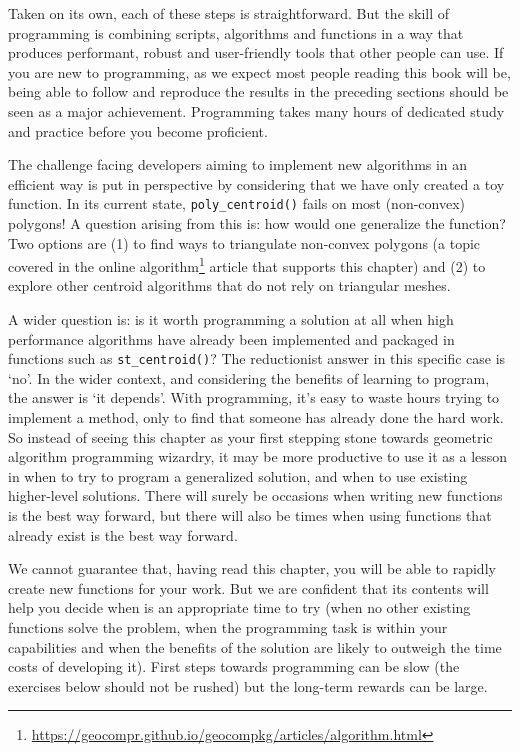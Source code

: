 \documentclass[]{krantz}
\let\rmarkdownfootnote\footnote%
\def\footnote{\protect\rmarkdownfootnote}
\renewcommand{\href}[2]{#2\footnote{\url{#1}}}
\begin{document}
Taken on its own, each of these steps is straightforward.
But the skill of programming is combining scripts, algorithms and functions in a way that produces performant, robust and user-friendly tools that other people can use.
If you are new to programming, as we expect most people reading this book will be, being able to follow and reproduce the results in the preceding sections should be seen as a major achievement.
Programming takes many hours of dedicated study and practice before you become proficient.

The challenge facing developers aiming to implement new algorithms in an efficient way is put in perspective by considering that we have only created a toy function.
In its current state, \texttt{poly\_centroid()} fails on most (non-convex) polygons!
A question arising from this is: how would one generalize the function?
Two options are (1) to find ways to triangulate non-convex polygons (a topic covered in the online \href{https://geocompr.github.io/geocompkg/articles/algorithm.html}{algorithm} article that supports this chapter) and (2) to explore other centroid algorithms that do not rely on triangular meshes.

A wider question is: is it worth programming a solution at all when high performance algorithms have already been implemented and packaged in functions such as \texttt{st\_centroid()}?
The reductionist answer in this specific case is `no'.
In the wider context, and considering the benefits of learning to program, the answer is `it depends'.
With programming, it's easy to waste hours trying to implement a method, only to find that someone has already done the hard work.
So instead of seeing this chapter as your first stepping stone towards geometric algorithm programming wizardry, it may be more productive to use it as a lesson in when to try to program a generalized solution, and when to use existing higher-level solutions.
There will surely be occasions when writing new functions is the best way forward, but there will also be times when using functions that already exist is the best way forward.

We cannot guarantee that, having read this chapter, you will be able to rapidly create new functions for your work.
But we are confident that its contents will help you decide when is an appropriate time to try (when no other existing functions solve the problem, when the programming task is within your capabilities and when the benefits of the solution are likely to outweigh the time costs of developing it).
First steps towards programming can be slow (the exercises below should not be rushed) but the long-term rewards can be large.
\end{document}
